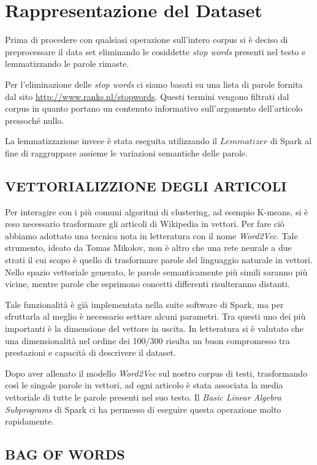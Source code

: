 \documentclass[
	11pt, %
	a4paper, %
	oneside, %
	headinclude,footinclude, %
	BCOR5mm, %
]{scrartcl}
\begin{document}
\section{Rappresentazione del Dataset}
	Prima di procedere con qualsiasi operazione sull'intero corpus si è deciso di preprocessare il data set eliminando le cosiddette \emph{stop words} presenti nel testo e lemmatizzando le parole rimaste.

	Per l'eliminazione delle \emph{stop words} ci siamo basati su una lista di parole fornita dal sito \url{http://www.ranks.nl/stopwords}.
	Questi termini vengono filtrati dal corpus in quanto portano un contenuto informativo sull'argomento dell'articolo pressoch\'{e} nullo.

	La lemmatizzazione invece è stata eseguita utilizzando il $Lemmatizer$ di Spark al fine di raggruppare assieme le variazioni semantiche delle parole.

	\subsection{VETTORIALIZZIONE DEGLI ARTICOLI}
		Per interagire con i più comuni algoritmi di clustering, ad esempio K-means, si è reso necessario trasformare gli articoli di Wikipedia in vettori.
		Per fare ciò abbiamo adottato una tecnica nota in letteratura con il nome \emph{Word2Vec}. Tale strumento, ideato da Tomas Mikolov, non è altro che una rete neurale a due strati il cui scopo è quello di trasformare parole del linguaggio naturale in vettori. Nello spazio vettoriale generato, le parole semanticamente più simili saranno più vicine, mentre parole che esprimono concetti differenti risulteranno distanti.

		Tale funzionalità è già implementata nella suite software di Spark, ma per sfruttarla al meglio è necessario settare alcuni parametri. Tra questi uno dei più importanti è la dimensione del vettore in uscita.
		In letteratura si è valutato che una dimensionalità nel ordine dei 100/300\cite{w2vdim} risulta un buon compromesso tra prestazioni e capacità di descrivere il dataset.

		Dopo aver allenato il modello \emph{Word2Vec} sul nostro corpus di testi, trasformando così le singole parole in vettori, ad ogni articolo è stata associata la media vettoriale di tutte le parole presenti nel suo testo. Il \emph{Basic Linear Algebra Subprograms} di Spark ci ha permesso di eseguire questa operazione molto rapidamente.

	\subsection{BAG OF WORDS} \label{sec:bag_of_words}
\end{document}
